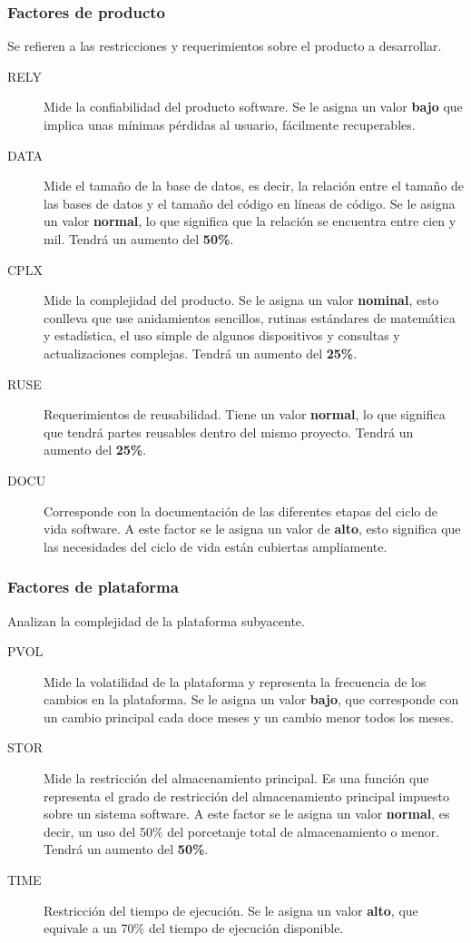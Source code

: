 \documentclass[11pt,a4paper,spanish,twoside]{book}
\begin{document}
\subsubsection{Factores de producto}
Se refieren a las restricciones y requerimientos sobre el producto a
desarrollar.
\begin{description}
\item[RELY] Mide la confiabilidad del producto software. Se le asigna un 
valor \textbf{bajo} que implica unas mínimas pérdidas al usuario,
fácilmente recuperables.

\item[DATA] Mide el tamaño de la base de datos, es decir, la relación entre
el tamaño de las bases de datos y el tamaño del código en líneas de código. Se
le asigna un valor \textbf{normal}, lo que significa que la relación se
encuentra entre cien y mil. Tendrá un aumento del \textbf{50\%}. 

\item[CPLX] Mide la complejidad del producto. Se le asigna un
valor \textbf{nominal}, esto conlleva que use anidamientos sencillos, rutinas
estándares de matemática y estadística, el uso simple de algunos dispositivos
y consultas y actualizaciones complejas. Tendrá un aumento del 
\textbf{25\%}.

\item[RUSE] Requerimientos de reusabilidad. Tiene un valor \textbf{normal},
lo que significa que tendrá partes reusables dentro del mismo
proyecto. Tendrá un aumento del \textbf{25\%}.

\item[DOCU] Corresponde con la documentación de las diferentes etapas del
ciclo de vida software. A este factor se le asigna un valor de \textbf{alto},
esto significa que las necesidades del ciclo de vida están cubiertas
ampliamente.

\end{description}

\subsubsection{Factores de plataforma}
Analizan la complejidad de la plataforma subyacente.
\begin{description}
\item[PVOL] Mide la volatilidad de la plataforma y representa la frecuencia de
  los cambios en la plataforma. Se le asigna un valor \textbf{bajo}, que
  corresponde con un cambio principal cada doce meses y un cambio menor todos
  los meses.

\item[STOR] Mide la restricción del almacenamiento principal. Es una función
  que representa el grado de restricción del almacenamiento principal
  impuesto sobre un sistema software. A este factor se le asigna un valor
  \textbf{normal}, es decir, un uso del 50\% del porcetanje total de
  almacenamiento o menor. Tendrá un aumento del \textbf{50\%}.

\item[TIME] Restricción del tiempo de ejecución. Se le asigna un valor
  \textbf{alto}, que equivale a un 70\% del tiempo de ejecución disponible.
\end{description}
\end{document}

